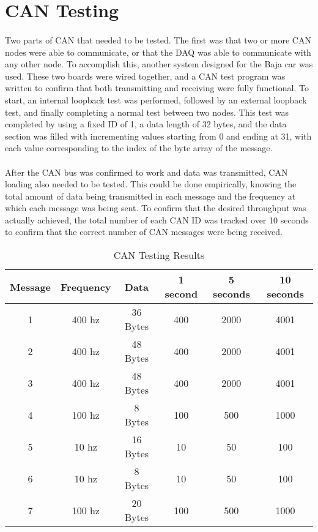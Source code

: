 \section{CAN Testing}

\paragraph{}
Two parts of CAN that needed to be tested.
The first was that two or more CAN nodes were able to communicate, or that the DAQ was able to communicate with any other node.
To accomplish this, another system designed for the Baja car was used.
These two boards were wired together, and a CAN test program was written to confirm that both transmitting and receiving were fully functional.
To start, an internal loopback test was performed, followed by an external loopback test, and finally completing a normal test between two nodes.
This test was completed by using a fixed ID of 1, a data length of 32 bytes, and the data section was filled with incrementing values starting from 0 and ending at 31, with each value corresponding to the index of the byte array of the message.

\paragraph{}
After the CAN bus was confirmed to work and data was transmitted, CAN loading also needed to be tested.
This could be done empirically, knowing the total amount of data being transmitted in each message and the frequency at which each message was being sent.
To confirm that the desired throughput was actually achieved, the total number of each CAN ID was tracked over 10 seconds to confirm that the correct number of CAN messages were being received.

\begin{table}[H] \label{table:CANTesting}
\caption{CAN Testing Results}
\centering
\begin{tabular}{c c c c c c}
\hline\hline
Message & Frequency & Data & 1 second & 5 seconds & 10 seconds \\ [0.5ex]
\hline
1 & 400 hz & 36 Bytes & 400 & 2000 & 4001 \\
2 & 400 hz & 48 Bytes & 400 & 2000 & 4001 \\
3 & 400 hz & 48 Bytes & 400 & 2000 & 4001 \\
4 & 100 hz & 8 Bytes & 100 & 500 & 1000 \\
5 & 10 hz & 16 Bytes & 10 & 50 & 100 \\
6 & 10 hz & 8 Bytes & 10 & 50 & 100 \\
7 & 100 hz & 20 Bytes & 100 & 500 & 1000 \\ [1ex]
\hline
\end{tabular}
\end{table}

